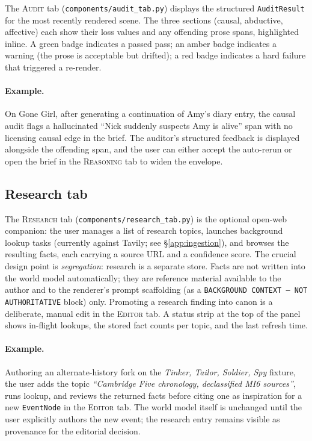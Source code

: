 \documentclass[11pt]{article}
\begin{document}
The \textsc{Audit} tab
(\texttt{components/audit\_tab.py}) displays the structured
\texttt{AuditResult} for the most recently rendered scene. The
three sections (causal, abductive, affective) each show their
loss values and any offending prose spans, highlighted inline. A
green badge indicates a passed pass; an amber badge indicates a
warning (the prose is acceptable but drifted); a red badge
indicates a hard failure that triggered a re-render.

\paragraph{Example.} On Gone Girl, after generating a continuation
of Amy's diary entry, the causal audit flags a hallucinated
``Nick suddenly suspects Amy is alive'' span with no licensing
causal edge in the brief. The auditor's structured feedback is
displayed alongside the offending span, and the user can either
accept the auto-rerun or open the brief in the
\textsc{Reasoning} tab to widen the envelope.

\subsection{Research tab}
\label{app:ui-research}

The \textsc{Research} tab
(\texttt{components/research\_tab.py}) is the optional
open-web companion: the user manages a list of research topics,
launches background lookup tasks (currently against Tavily; see
\S\ref{app:ingestion}), and browses the resulting facts, each
carrying a source URL and a confidence score. The crucial design
point is \emph{segregation}: research is a separate store. Facts
are not written into the world model automatically; they are
reference material available to the author and to the renderer's
prompt scaffolding (as a \texttt{BACKGROUND CONTEXT --- NOT
AUTHORITATIVE} block) only. Promoting a research finding into
canon is a deliberate, manual edit in the \textsc{Editor} tab.
A status strip at the top of the panel shows in-flight lookups,
the stored fact counts per topic, and the last refresh time.

\paragraph{Example.} Authoring an alternate-history fork on the
\emph{Tinker, Tailor, Soldier, Spy} fixture, the user adds the
topic \emph{``Cambridge Five chronology, declassified MI6
sources''}, runs lookup, and reviews the returned facts before
citing one as inspiration for a new \texttt{EventNode} in the
\textsc{Editor} tab. The world model itself is unchanged until
the user explicitly authors the new event; the research entry
remains visible as provenance for the editorial decision.
\end{document}
